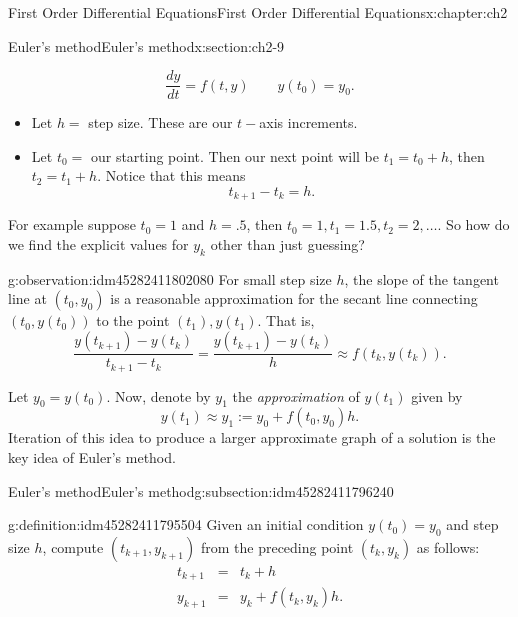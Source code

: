 \documentclass[oneside,10pt,]{book}
\numberwithin{equation}{section}
\numberwithin{equation}{section}
\newcommand{\amp}{&}
\begin{document}
\begin{chapterptx}{First Order Differential Equations}{}{First Order Differential Equations}{}{}{x:chapter:ch2}
\begin{sectionptx}{Euler's method}{}{Euler's method}{}{}{x:section:ch2-9}
\begin{introduction}{}
\begin{equation*}
\frac{dy}{dt}=f(t,y)\qquad y(t_{0})=y_{0}.
\end{equation*}
%
%
\begin{itemize}[label=\textbullet]
\item{}Let \(h=\) step size. These are our \(t-\)axis increments.%
\item{}Let \(t_{0}=\) our starting point. Then our next point will be \(t_{1}=t_{0}+h\), then \(t_{2}=t_{1}+h\). Notice that this means%
\begin{equation*}
t_{k+1} - t_k = h.
\end{equation*}
%
\end{itemize}
For example suppose \(t_{0}=1\) and \(h=.5\), then \(t_{0}=1,t_{1}=1.5,t_{2}=2,\dots\). So how do we find the explicit values for \(y_{k}\) other than just guessing?%
\begin{observation}{}{g:observation:idm45282411802080}%
For small step size \(h\), the slope of the tangent line at \((t_0, y_0)\) is a reasonable approximation for the secant line connecting \((t_0, y(t_0))\) to the point \((t_1), y(t_1)\). That is,%
\begin{equation*}
\frac{y(t_{k+1}) - y(t_k)}{t_{k+1} - t_k} = \frac{y(t_{k+1}) - y(t_k)}{h} \approx f(t_k, y(t_k)).
\end{equation*}
\end{observation}
Let \(y_0 = y(t_0)\). Now, denote by \(y_1\) the \emph{approximation} of \(y(t_1)\) given by%
\begin{equation*}
y(t_1) \approx y_1 := y_0 + f(t_0, y_0) h.
\end{equation*}
Iteration of this idea to produce a larger approximate graph of a solution is the key idea of Euler's method.%
\end{introduction}%
%
%
\typeout{************************************************}
\typeout{************************************************}
%
\begin{subsectionptx}{Euler's method}{}{Euler's method}{}{}{g:subsection:idm45282411796240}
\begin{definition}{}{g:definition:idm45282411795504}%
Given an initial condition \(y(t_{0})=y_{0}\) and step size \(h\), compute \(\left(t_{k+1},y_{k+1}\right)\) from the preceding point \((t_{k},y_{k})\) as follows:%
\begin{align*}
t_{k+1} \amp = \amp t_{k}+h\\
y_{k+1} \amp = \amp y_{k}+f\left(t_{k},y_{k}\right)h.
\end{align*}

\end{definition}
\end{subsectionptx}
\end{sectionptx}
\end{chapterptx}
\end{document}
